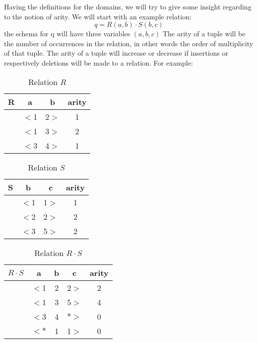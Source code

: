 \documentclass[12pt]{article}
\begin{document}
Having the definitions for the domains, we will try to give some insight regarding to the notion of arity. We will start with an example relation: $$q=R(a,b)\cdot S(b,c)$$ the schema for q will have three variables $(a,b,c)$ The arity of a tuple will be the number of occurrences in the relation, in other words the order of multiplicity of that tuple. The arity of a tuple will increase or decrease if insertions or respectively deletions will be made to a relation. For example:
\begin{table}[ht]
\centering
\begin{tabular}{c c c c}
	R & a & b & arity\\ [0.2ex]
	\hline
	  & $<$1 & 2$>$ & 1 \\
	  & $<$1 & 3$>$ & 2 \\
	  & $<$3 & 4$>$ & 1 \\
\end{tabular}
\caption{Relation $R$}
\end{table}
\begin{table}[ht]
\centering
\begin{tabular}{c c c c}
	S & b & c & arity\\ [0.2ex]
	\hline
	  & $<$1 & 1$>$ & 1 \\
	  & $<$2 & 2$>$ & 2 \\
	  & $<$3 & 5$>$ & 2 \\
\end{tabular}
\caption{Relation $S$}
\end{table}
\begin{table}[ht]
\centering
\begin{tabular}{c c c c c}
	$R\cdot S$ & a & b & c & arity\\ [0.2ex]
	\hline
	  & $<$1 & 2 & 2$>$ & 2 \\
	  & $<$1 & 3 & 5$>$ & 4 \\
	  & $<$3 & 4 & $*>$ & 0 \\
	  & $<*$ & 1 & 1$>$ & 0 \\
\end{tabular}
\caption{Relation $R\cdot S$}
\end{table}
\end{document}
